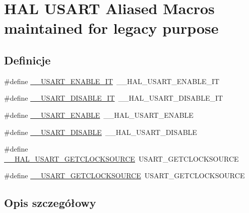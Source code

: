 \hypertarget{group___h_a_l___u_s_a_r_t___aliased___macros}{}\section{H\+AL U\+S\+A\+RT Aliased Macros maintained for legacy purpose}
\label{group___h_a_l___u_s_a_r_t___aliased___macros}
\subsection*{Definicje}
\begin{DoxyCompactItemize}
\item 
\#define \hyperlink{group___h_a_l___u_s_a_r_t___aliased___macros_gab99081ba6bb70f397ab2def3f644c3c1}{\+\_\+\+\_\+\+U\+S\+A\+R\+T\+\_\+\+E\+N\+A\+B\+L\+E\+\_\+\+IT}~\+\_\+\+\_\+\+H\+A\+L\+\_\+\+U\+S\+A\+R\+T\+\_\+\+E\+N\+A\+B\+L\+E\+\_\+\+IT
\item 
\#define \hyperlink{group___h_a_l___u_s_a_r_t___aliased___macros_ga12ae7c59b7d95f0f8606fca7bba57db8}{\+\_\+\+\_\+\+U\+S\+A\+R\+T\+\_\+\+D\+I\+S\+A\+B\+L\+E\+\_\+\+IT}~\+\_\+\+\_\+\+H\+A\+L\+\_\+\+U\+S\+A\+R\+T\+\_\+\+D\+I\+S\+A\+B\+L\+E\+\_\+\+IT
\item 
\#define \hyperlink{group___h_a_l___u_s_a_r_t___aliased___macros_gae03c01e0ee50608e887842bacbf5b361}{\+\_\+\+\_\+\+U\+S\+A\+R\+T\+\_\+\+E\+N\+A\+B\+LE}~\+\_\+\+\_\+\+H\+A\+L\+\_\+\+U\+S\+A\+R\+T\+\_\+\+E\+N\+A\+B\+LE
\item 
\#define \hyperlink{group___h_a_l___u_s_a_r_t___aliased___macros_gac894c090835b348469f36bfed6e78fbd}{\+\_\+\+\_\+\+U\+S\+A\+R\+T\+\_\+\+D\+I\+S\+A\+B\+LE}~\+\_\+\+\_\+\+H\+A\+L\+\_\+\+U\+S\+A\+R\+T\+\_\+\+D\+I\+S\+A\+B\+LE
\item 
\#define \hyperlink{group___h_a_l___u_s_a_r_t___aliased___macros_ga0ed768f9a18f877413306078c442a2a5}{\+\_\+\+\_\+\+H\+A\+L\+\_\+\+U\+S\+A\+R\+T\+\_\+\+G\+E\+T\+C\+L\+O\+C\+K\+S\+O\+U\+R\+CE}~U\+S\+A\+R\+T\+\_\+\+G\+E\+T\+C\+L\+O\+C\+K\+S\+O\+U\+R\+CE
\item 
\#define \hyperlink{group___h_a_l___u_s_a_r_t___aliased___macros_gaa00a53bf6bc2bee096abb57d4ace2384}{\+\_\+\+\_\+\+U\+S\+A\+R\+T\+\_\+\+G\+E\+T\+C\+L\+O\+C\+K\+S\+O\+U\+R\+CE}~U\+S\+A\+R\+T\+\_\+\+G\+E\+T\+C\+L\+O\+C\+K\+S\+O\+U\+R\+CE
\end{DoxyCompactItemize}


\subsection{Opis szczegółowy}


